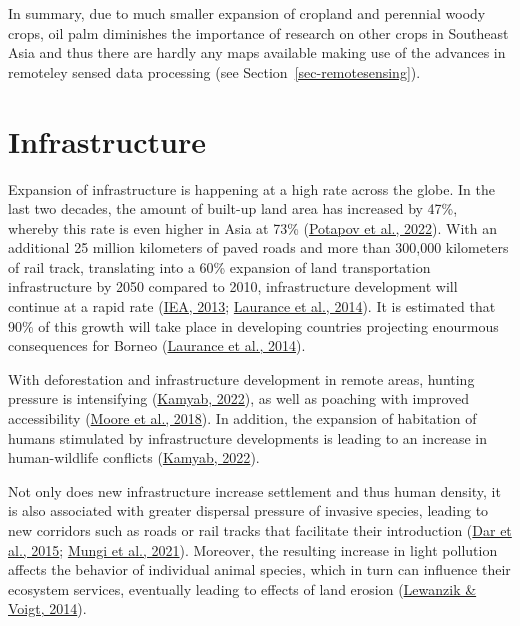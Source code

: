 \documentclass[
  letterpaper,
  DIV=11,
  numbers=noendperiod]{scrreprt}
\begin{document}
In summary, due to much smaller expansion of cropland and perennial
woody crops, oil palm diminishes the importance of research on other
crops in Southeast Asia and thus there are hardly any maps available
making use of the advances in remoteley sensed data processing (see
Section~\ref{sec-remotesensing}).

\hypertarget{sec-infrastructure}{%
\section{Infrastructure}\label{sec-infrastructure}}

Expansion of infrastructure is happening at a high rate across the
globe. In the last two decades, the amount of built-up land area has
increased by 47\%, whereby this rate is even higher in Asia at 73\%
(\protect\hyperlink{ref-potapovGlobal20002020Land2022}{Potapov et al.,
2022}). With an additional 25 million kilometers of paved roads and more
than 300,000 kilometers of rail track, translating into a 60\% expansion
of land transportation infrastructure by 2050 compared to 2010,
infrastructure development will continue at a rapid rate
(\protect\hyperlink{ref-ieaGlobalLandTransport2013}{IEA, 2013};
\protect\hyperlink{ref-lauranceGlobalStrategyRoad2014}{Laurance et al.,
2014}). It is estimated that 90\% of this growth will take place in
developing countries projecting enourmous consequences for Borneo
(\protect\hyperlink{ref-lauranceGlobalStrategyRoad2014}{Laurance et al.,
2014}).

With deforestation and infrastructure development in remote areas,
hunting pressure is intensifying
(\protect\hyperlink{ref-kamyabElaeisGuineensis2022}{Kamyab, 2022}), as
well as poaching with improved accessibility
(\protect\hyperlink{ref-mooreAreRangerPatrols2018}{Moore et al., 2018}).
In addition, the expansion of habitation of humans stimulated by
infrastructure developments is leading to an increase in human-wildlife
conflicts (\protect\hyperlink{ref-kamyabElaeisGuineensis2022}{Kamyab,
2022}).

Not only does new infrastructure increase settlement and thus human
density, it is also associated with greater dispersal pressure of
invasive species, leading to new corridors such as roads or rail tracks
that facilitate their introduction
(\protect\hyperlink{ref-darRoadsActCorridors2015}{Dar et al., 2015};
\protect\hyperlink{ref-mungiRoleSpeciesRichness2021}{Mungi et al.,
2021}). Moreover, the resulting increase in light pollution affects the
behavior of individual animal species, which in turn can influence their
ecosystem services, eventually leading to effects of land erosion
(\protect\hyperlink{ref-lewanzikArtificialLightPuts2014}{Lewanzik \&
Voigt, 2014}).
\end{document}
